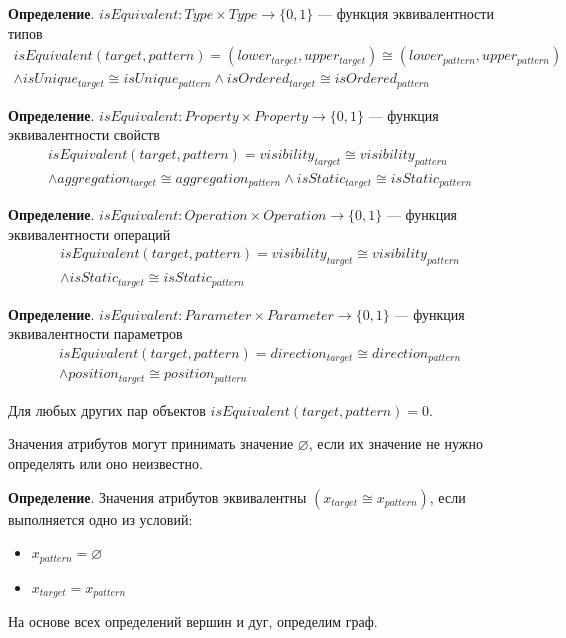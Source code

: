 \textbf{Определение}. $isEquivalent: Type \times Type \to \{ 0, 1 \}$
--- функция эквивалентности типов
%
\begin{multline*}
isEquivalent(target, pattern) = (lower_{target}, upper_{target}) \cong (lower_{pattern}, upper_{pattern}) \\
\land isUnique_{target} \cong isUnique_{pattern} \land isOrdered_{target} \cong isOrdered_{pattern}
\end{multline*}

\textbf{Определение}. $isEquivalent: Property \times Property \to \{ 0, 1 \}$
--- функция эквивалентности свойств
%
\begin{multline*}
isEquivalent(target, pattern) = visibility_{target} \cong visibility_{pattern} \\
\land aggregation_{target} \cong aggregation_{pattern} \land isStatic_{target} \cong isStatic_{pattern}
\end{multline*}

\textbf{Определение}. $isEquivalent: Operation \times Operation \to \{ 0, 1 \}$
--- функция эквивалентности операций
%
\begin{multline*}
isEquivalent(target, pattern) = visibility_{target} \cong visibility_{pattern} \\
\land isStatic_{target} \cong isStatic_{pattern}
\end{multline*}

\textbf{Определение}. $isEquivalent: Parameter \times Parameter \to \{ 0, 1 \}$
--- функция эквивалентности параметров
%
\begin{multline*}
isEquivalent(target, pattern) = direction_{target} \cong direction_{pattern} \\
\land position_{target} \cong position_{pattern}
\end{multline*}

Для любых других пар объектов $isEquivalent(target, pattern) = 0$.

Значения атрибутов могут принимать значение $\varnothing$,
если их значение не нужно определять или оно неизвестно.

\textbf{Определение}. Значения атрибутов эквивалентны
$(x_{target} \cong x_{pattern})$, если выполняется одно из условий:
\begin{itemize}
\item $x_{pattern} = \varnothing$
\item $x_{target} = x_{pattern}$
\end{itemize}

На основе всех определений вершин и дуг, определим граф.

